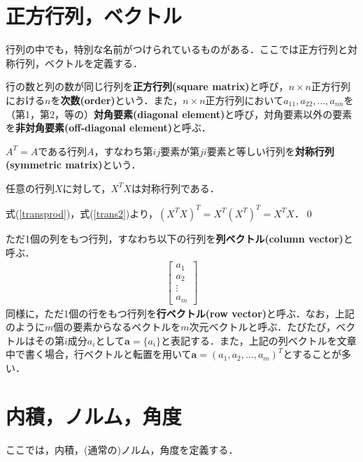 \section{正方行列，ベクトル}
行列の中でも，特別な名前がつけられているものがある．ここでは正方行列と対称行列，ベクトルを定義する．

\begin{defi}[正方行列]
行の数と列の数が同じ行列を{\bf 正方行列(square matrix)}と呼び，$n\times n$正方行列における$n$を{\bf 次数(order)}という．また，$n\times n$正方行列において$a_{11},a_{22},\ldots,a_{nn}$を（第1，第2，等の）{\bf 対角要素(diagonal element)}と呼び，対角要素以外の要素を{\bf 非対角要素(off-diagonal element)}と呼ぶ．
\end{defi}

\begin{defi}[対称行列]
$A^T=A$である行列$A$，すなわち第$ij$要素が第$ji$要素と等しい行列を{\bf 対称行列(symmetric matrix)}という．
\end{defi}

\begin{theo}
任意の行列$X$に対して，$X^TX$は対称行列である．	
\end{theo}
\begin{pro}
式(\ref{transprod})，式(\ref{trans2})より，$(X^TX)^T=X^T(X^T)^T=X^TX$．\qed	
\end{pro}

\begin{defi}[ベクトル]
ただ1個の列をもつ行列，すなわち以下の行列を{\bf 列ベクトル(column vector)}と呼ぶ．
\begin{align*}
\begin{bmatrix}
a_{1} \\
a_{2} \\
\vdots \\
a_{m} 
\end{bmatrix}	
\end{align*}
同様に，ただ1個の行をもつ行列を{\bf 行ベクトル(row vector)}と呼ぶ．なお，上記のように$m$個の要素からなるベクトルを$m$次元ベクトルと呼ぶ．たびたび，ベクトルはその第$i$成分$a_{i}$として${\bm a}=\{a_{i}\}$と表記する．また，上記の列ベクトルを文章中で書く場合，行ベクトルと転置を用いて${\bm a}=(a_1,a_2,\ldots,a_m)^T$とすることが多い．
\end{defi}

\section{内積，ノルム，角度}
ここでは，内積，(通常の)ノルム，角度を定義する．

